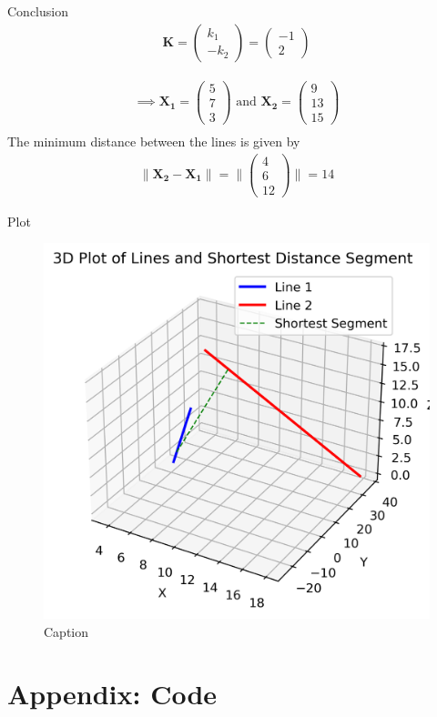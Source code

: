 \documentclass{beamer}
\numberwithin{equation}{section}
\theoremstyle{remark}
\providecommand{\norm}[1]{\lVert#1\rVert}
\newcommand{\myvec}[1]{\ensuremath{\begin{pmatrix}#1\end{pmatrix}}}
\let\vec\mathbf
\begin{document}
\begin{frame}{Conclusion}
    \begin{align}
\vec{K}=\myvec{k_1\\-k_2}=\myvec{-1\\2}
\end{align}

\begin{align}
    \implies \vec{X_1}=\myvec{5\\7\\3} \text{ and }\vec{X_2}=\myvec{9\\13\\15}\\
\end{align}
The minimum distance between the lines is given by
\begin{align}
    \norm{\vec{X_2-X_1}}=\norm{\myvec{4\\6\\12}}=14
\end{align} 
\end{frame}

\begin{frame}{Plot}
    \begin{figure}[h!]
    \centering
    \includegraphics[width=0.6\columnwidth]{figs/01.png}
    \caption{Caption}
    \label{fig:placeholder}
\end{figure}
\end{frame}

\section*{Appendix: Code}
\end{document}
